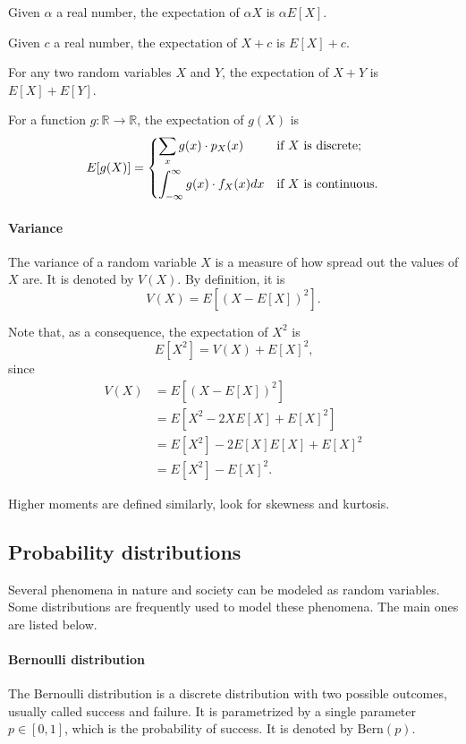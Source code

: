 Given $\alpha$ a real number, the expectation of $\alpha X$ is $\alpha E[X]$.

Given $c$ a real number, the expectation of $X + c$ is $E[X] + c$.

For any two random variables $X$ and $Y$, the expectation of $X + Y$ is $E[X] + E[Y]$.

For a function $g : \mathbb{R} \rightarrow \mathbb{R}$, the expectation of $g(X)$ is
\begin{equation}
  \label{eq:egx}
  E[g(X)] = \begin{dcases}
    \sum_{x} g(x) \cdot p_X(x) & \text{if $X$ is discrete; } \\
    \int_{-\infty}^{\infty} g(x) \cdot f_X(x) dx & \text{if $X$ is continuous.}
  \end{dcases}
\end{equation}

\paragraph{Variance}  The variance of a random variable $X$ is a measure of how
spread out the values of $X$ are.  It is denoted by $V(X)$.  By definition, it is
\begin{equation}
  \label{eq:variance}
  V(X) = E\!\left[\left(X - E[X]\right)^2\right]\text{.}
\end{equation}

Note that, as a consequence, the expectation of $X^2$ is
\[
  E[X^2] = V(X) + E[X]^2\text{,}
\]
since
\begin{align*}
  V(X)
    &= E\!\left[\left(X - E[X]\right)^2\right] \\
    &= E\!\left[X^2 - 2 X E[X] + E[X]^2\right] \\
    &= E[X^2] - 2 E[X] E[X] + E[X]^2 \\
    &= E[X^2] - E[X]^2\text{.}
\end{align*}

Higher moments are defined similarly, look for skewness and kurtosis.

\subsection{Probability distributions}

Several phenomena in nature and society can be modeled as random variables.  Some
distributions are frequently used to model these phenomena.  The main ones are
listed below.

\paragraph{Bernoulli distribution}  The Bernoulli distribution is a discrete
distribution with two possible outcomes, usually called success and failure.  It is
parametrized by a single parameter $p \in [0, 1]$, which is the probability of
success.  It is denoted by $\text{Bern}(p)$.

